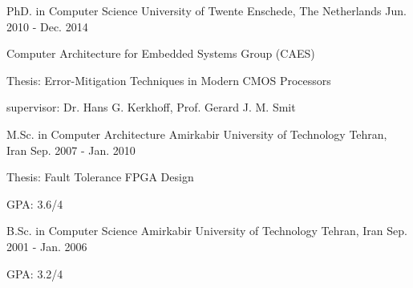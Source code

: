 

\begin{cventries}

  \cventry
    {PhD. in Computer Science} %
    {University of Twente} %
    {Enschede, The Netherlands} %
    {Jun. 2010 - Dec. 2014} %
    {
      \begin{cvitems} %
	\item {Computer Architecture for Embedded Systems Group (CAES)}
        \item {Thesis: Error-Mitigation Techniques in Modern CMOS Processors}
	\item {supervisor: Dr. Hans G. Kerkhoff, Prof. Gerard J. M. Smit}
      \end{cvitems}
    }

  \cventry
    {M.Sc. in Computer Architecture} %
    {Amirkabir University of Technology} %
    {Tehran, Iran} %
    {Sep. 2007 - Jan. 2010} %
    {
      \begin{cvitems} %
        \item {Thesis: Fault Tolerance FPGA Design}
	\item {GPA: 3.6/4}
      \end{cvitems}
    }

  \cventry
    {B.Sc. in Computer Science} %
    {Amirkabir University of Technology} %
    {Tehran, Iran} %
    {Sep. 2001 - Jan. 2006} %
    {
      \begin{cvitems} %
	\item {GPA: 3.2/4}
      \end{cvitems}
    }
\end{cventries}
